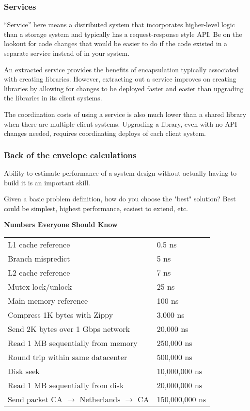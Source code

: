 \documentclass{article}
\begin{document}
    \subsubsection{Services}
    ``Service” here means a distributed system that incorporates higher-level logic than a storage system and typically has a request-response style API. Be on the lookout for code changes that would be easier to do if the code existed in a separate service instead of in your system.
    
    An extracted service provides the benefits of encapsulation typically associated with creating libraries. However, extracting out a service improves on creating libraries by allowing for changes to be deployed faster and easier than upgrading the libraries in its client systems.
    
    The coordination costs of using a service is also much lower than a shared library when there are multiple client systems. Upgrading a library, even with no API changes needed, requires coordinating deploys of each client system.

    \subsubsection{Back of the envelope calculations}
    Ability to estimate performance of a system design without actually having to build it is an important skill.
    
    Given a basic problem definition, how do you choose the "best" solution? Best could be simplest, highest performance, easiest to extend, etc.
    
    \textbf{Numbers Everyone Should Know}
    
    \begin{table}[H]
    \begin{tabular}{ll}
        L1 cache reference & 0.5 ns  \\
        Branch mispredict &  5 ns \\
        L2 cache reference & 7 ns \\
        Mutex lock/unlock & 25 ns \\
        Main memory reference & 100 ns \\
        Compress 1K bytes with Zippy & 3,000 ns \\
        Send 2K bytes over 1 Gbps network & 20,000 ns \\
        Read 1 MB sequentially from memory & 250,000 ns \\
        Round trip within same datacenter & 500,000 ns \\
        Disk seek & 10,000,000 ns \\
        Read 1 MB sequentially from disk & 20,000,000 ns \\
        Send packet CA $\to$ Netherlands $\to$ CA & 150,000,000 ns \\
    \end{tabular}
    \end{table}
    
\end{document}
